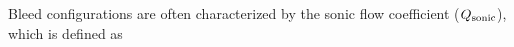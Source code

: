 \documentclass{article}
\begin{document}
Bleed configurations are often characterized by the sonic flow coefficient ($Q_{\textrm{sonic}}$), which is defined as \cite{Slater2012}

%
\printbibliography
\end{document}
